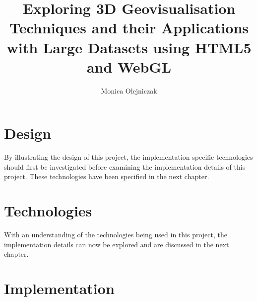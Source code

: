 \documentclass[
	paper=A4,
    titlepage=true,
	fontsize=11pt,
	parskip=half
]{scrreprt}
\title{Exploring 3D Geovisualisation Techniques and their Applications with Large Datasets using HTML5 and WebGL}
\author{Monica Olejniczak}
\begin{document}
	
	



	
	\chapter{Design} {
	\label{ch:design}
		
	}

	By illustrating the design of this project, the implementation specific technologies should first be investigated before examining the implementation details of this project. These technologies have been specified in the next chapter.

	\chapter{Technologies} {
	\label{ch:technologies}
		
	}

	With an understanding of the technologies being used in this project, the implementation details can now be explored and are discussed in the next chapter.
	
	\chapter{Implementation} {
	\label{ch:implementation}
		
	}


\end{document}
